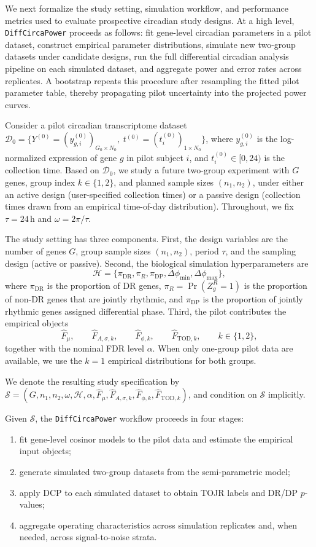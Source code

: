 \documentclass{article}
\newcommand{\software}[1]{\texttt{#1}}
\begin{document}
We next formalize the study setting, simulation workflow, and performance
metrics used to evaluate prospective circadian study designs. At a high level,
\software{DiffCircaPower} proceeds as follows: fit gene-level circadian
parameters in a pilot dataset, construct empirical parameter distributions,
simulate new two-group datasets under candidate designs, run the full
differential circadian analysis pipeline on each simulated dataset, and
aggregate power and error rates across replicates. A bootstrap repeats this
procedure after resampling the fitted pilot parameter table, thereby propagating
pilot uncertainty into the projected power curves.

Consider a pilot circadian transcriptome dataset
\(\mathcal{D}_0=\{Y^{(0)}=(y^{(0)}_{g,i})_{G_0\times N_0},\;
t^{(0)}=(t_i^{(0)})_{1\times N_0}\}\),
where $y^{(0)}_{g,i}$ is the log-normalized expression of gene $g$ in pilot
subject $i$, and $t_i^{(0)}\in[0,24)$ is the collection time.
Based on $\mathcal{D}_0$, we study a future two-group experiment with $G$
genes, group index $k\in\{1,2\}$, and planned sample sizes $(n_1,n_2)$,
under either an active design (user-specified collection times) or a passive
design (collection times drawn from an empirical time-of-day distribution).
Throughout, we fix $\tau=24$\,h and $\omega=2\pi/\tau$.

The study setting has three components. First, the design variables are the
number of genes $G$, group sample sizes $(n_1,n_2)$, period $\tau$, and the
sampling design (active or passive). Second, the biological simulation
hyperparameters are
\[
\mathcal{H}
=
\{\pi_{\mathrm{DR}},\pi_{R},\pi_{\mathrm{DP}},
\Delta\phi_{\min},\Delta\phi_{\max}\},
\]
where $\pi_{\mathrm{DR}}$ is the proportion of DR genes,
$\pi_R=\Pr(Z_g^R=1)$ is the proportion of non-DR genes that are jointly
rhythmic, and $\pi_{\mathrm{DP}}$ is the proportion of jointly rhythmic genes
assigned differential phase. Third, the pilot contributes the empirical objects
\[
\hat{F}_\mu,\qquad
\hat{F}_{A,\sigma,k},\qquad
\hat{F}_{\phi,k},\qquad
\hat{F}_{\mathrm{TOD},k},
\qquad k\in\{1,2\},
\]
together with the nominal FDR level $\alpha$. When only one-group pilot data
are available, we use the $k=1$ empirical distributions for both groups.

We denote the resulting study specification by
\(\mathcal{S}=(G,n_1,n_2,\omega,\mathcal{H},\alpha,\hat{F}_\mu,
\hat{F}_{A,\sigma,k},\hat{F}_{\phi,k},\hat{F}_{\mathrm{TOD},k})\),
and condition on $\mathcal{S}$ implicitly.

Given $\mathcal{S}$, the \software{DiffCircaPower} workflow proceeds in four
stages:
\begin{enumerate}
\item fit gene-level cosinor models to the pilot data and estimate the
empirical input objects;
\item generate simulated two-group datasets from the semi-parametric model;
\item apply DCP to each simulated dataset to obtain TOJR labels and DR/DP
$p$-values;
\item aggregate operating characteristics across simulation replicates and, when
needed, across signal-to-noise strata.
\end{enumerate}
\end{document}
